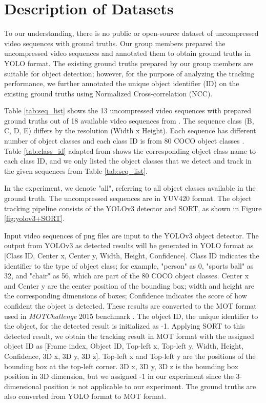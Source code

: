 \section{Description of Datasets}
\label{sec:methods/section_a}

To our understanding, there is no public or open-source dataset of uncompressed video sequences with ground truths. Our group members prepared the uncompressed video sequences and annotated them to obtain ground truths in YOLO format. The existing ground truths prepared by our group members are suitable for object detection; however, for the purpose of analyzing the tracking performance, we further annotated the unique object identifier (ID) on the existing ground truths using Normalized Cross-correlation (NCC).

Table \ref{tab:seq_list} shows the 13 uncompressed video sequences with prepared ground truths out of 18 available video sequences from \cite{choi_vcm_2020}. The sequence class (B, C, D, E) differs by the resolution (Width x Height). Each sequence has different number of object classes and each class ID is from 80 COCO object classes \cite{lin_microsoft_2014}. Table \ref{tab:class_id} adapted from \cite{choi_vcm_2020} shows the corresponding object class name to each class ID, and we only listed the object classes that we detect and track in the given sequences from Table \ref{tab:seq_list}.

In the experiment, we denote "all", referring to all object classes available in the ground truth. The uncompressed sequences are in YUV420 format. The object tracking pipeline consists of the YOLOv3 detector and SORT, as shown in Figure \ref{fig:yolov3+SORT}. 

Input video sequences of png files are input to the YOLOv3 object detector. The output from YOLOv3 as detected results will be generated in YOLO format as [Class ID, Center x, Center y, Width, Height, Confidence]. Class ID indicates the identifier to the type of object class; for example, "person" as 0, "sports ball" as 32, and "chair" as 56, which are part of the 80 COCO object classes. Center x and Center y are the center position of the bounding box; width and height are the corresponding dimensions of boxes; Confidence indicates the score of how confident the object is detected. These results are converted to the MOT format used in \textit{MOTChallenge} 2015 benchmark \cite{leal-taixe_motchallenge_2015}. The object ID, the unique identifier to the object, for the detected result is initialized as -1. Applying SORT to this detected result, we obtain the tracking result in MOT format with the assigned object ID as [Frame index, Object ID, Top-left x, Top-left y, Width, Height, Confidence, 3D x, 3D y, 3D z]. Top-left x and Top-left y are the positions of the bounding box at the top-left corner. 3D x, 3D y, 3D z is the bounding box position in 3D dimension, but we assigned -1 in our experiment since the 3-dimensional position is not applicable to our experiment. The ground truths are also converted from YOLO format to MOT format.

